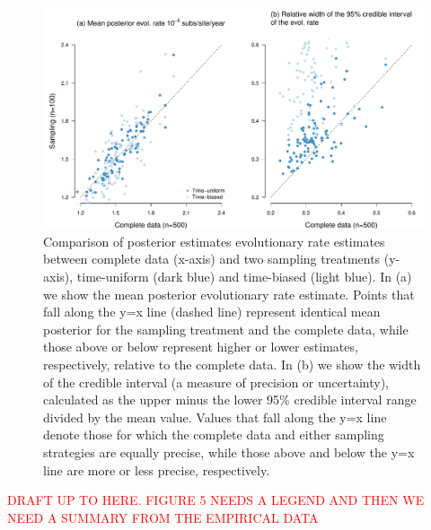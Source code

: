 \documentclass[11pt]{article}
\begin{document}
\begin{figure}[H]
	\begin{center}
		\includegraphics[scale=0.5, angle=0]{sampling_bias_summary_rates.pdf}
		\caption{Comparison of posterior estimates evolutionary rate estimates between complete data (x-axis) and two sampling treatments (y-axis), time-uniform (dark blue) and time-biased (light blue). In (a) we show the mean posterior evolutionary rate estimate. Points that fall along the y=x line (dashed line) represent identical mean posterior for the sampling treatment and the complete data, while those above or below represent higher or lower estimates, respectively, relative to the complete data. In (b) we show the width of the credible interval (a measure of precision or uncertainty), calculated as the upper minus the lower 95\% credible interval range divided by the mean value. Values that fall along the y=x line denote those for which the complete data and either sampling strategies are equally precise, while those above and below the y=x line are more or less precise, respectively.}
		\label{figure:Fig5}
	\end{center}
\end{figure}


\textcolor{red}{DRAFT UP TO HERE. FIGURE 5 NEEDS A LEGEND AND THEN WE NEED A SUMMARY FROM THE EMPIRICAL DATA}
	
\end{document}
